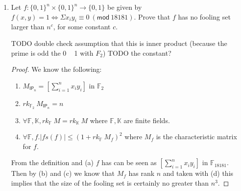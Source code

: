 \documentclass[usletter]{article}
\begin{document}

\begin{enumerate}
  \item Let $f : \{0,1\}^n \times \{0,1\}^n \rightarrow \{0,1\}$ be given by $f(x,y) = 1 \Leftrightarrow \Sigma x_i y_i \equiv 0\ (\mathsf{mod}\ 18181)$. Prove that $f$ has no fooling set larger than $n^c$, for some constant $c$.


    TODO double check assumption that this is inner product (because the prime is odd the 0 ~ 1 with $F_2$)
    TODO the constant?

    \begin{proof}
      We know the following:

      \begin{enumerate}
        \item $M_{\mathsf{IP}_n} = \left [ \sum_{i=1}^{n} x_i y_i \right ]$ in $\mathbb{F}_2$
        \item $rk_{\mathbb{F}_2}\ M_{\mathsf{IP}_n} = n$
        \item $\forall \mathbb{F}, \mathbb{K}, rk_{\mathbb{F}}\ M = rk_{\mathbb{K}}\ M$ where $\mathbb{F}, \mathbb{K}$ are finite fields.
        \item $\forall \mathbb{F}, f.|fs(f)| \leq (1 + rk_{\mathbb{F}}\ M_f)^2$ where $M_f$ is the characteristic matrix for $f$.
      \end{enumerate}

      From the definition and (a) $f$ has can be seen as $\left [ \sum_{i=1}^{n} x_i y_i \right ]$ in $\mathbb{F}_{18181}$. Then by (b) and (c) we know that $M_f$ has rank $n$ and taken with (d) this implies that the size of the fooling set is certainly no greater than $n^3$.
    \end{proof}


\end{enumerate}

\newpage



\end{document}
